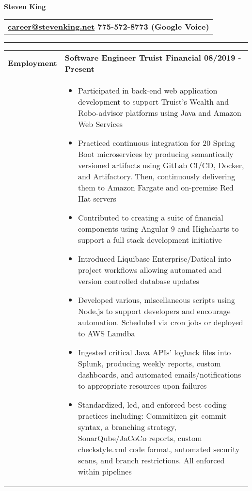 \documentclass[final]{letter}
\begin{document}
	\begin{center}
		{\fontsize{36}{43.2}\selectfont\bf{Steven King}} \hspace{.1cm} {
			\begin{tabular}{c}\large\bf{\href{mailto:career@stevenking.net}{career@stevenking.net} \hspace{.2cm} 775-572-8773 (Google Voice)} \end{tabular}}
		
		\rule{.99\textwidth}{1pt}	

		\begin{tabularx}{\linewidth}{>{\raggedright\bf\Large{}}p{10.75em}X} Employment 
			& \large\bf{Software Engineer \hfill {Truist Financial} \hfill 08/2019 - Present} \\
			& \begin{itemize}[noitemsep,topsep=0pt]\setlength\itemsep{2px}
				\item Participated in back-end web application development to support Truist's Wealth and Robo-advisor platforms using Java and Amazon Web Services
				\item Practiced continuous integration for 20 Spring Boot microservices by producing semantically versioned artifacts using GitLab CI/CD, Docker, and Artifactory. Then, continuously delivering them to Amazon Fargate and on-premise Red Hat servers 
				\item Contributed to creating a suite of financial components using Angular 9 and Highcharts to support a full stack development initiative
				\item Introduced Liquibase Enterprise/Datical into project workflows allowing automated and version controlled database updates
				\item Developed various, miscellaneous scripts using Node.js to support developers and encourage automation. Scheduled via cron jobs or deployed to AWS Lamdba
				\item Ingested critical Java APIs' logback files into Splunk, producing weekly reports, custom dashboards, and automated emails/notifications to appropriate resources upon failures
				\item Standardized, led, and enforced best coding practices including: Commitizen git commit syntax, a branching strategy, SonarQube/JaCoCo reports, custom checkstyle.xml code format, automated security scans, and branch restrictions. All enforced within pipelines
			\end{itemize} \\
		

\end{tabularx}
\end{center}
\end{document}

